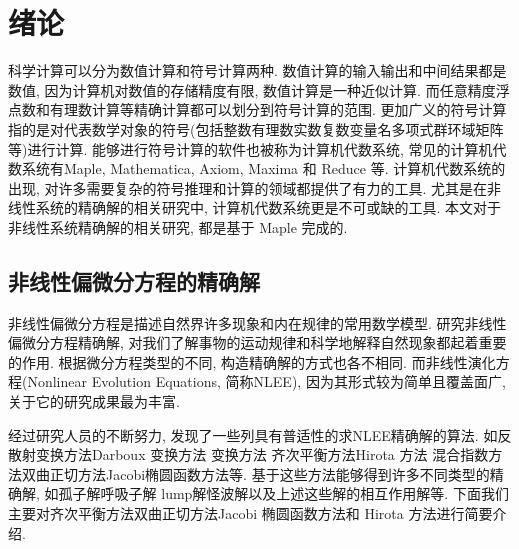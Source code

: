 \chapter{绪论} 
科学计算可以分为数值计算和符号计算两种. 数值计算的输入输出和中间结果都是数值, 因为计算机对数值的存储精度有限, 数值计算是一种近似计算. 而任意精度浮点数和有理数计算等精确计算都可以划分到符号计算的范围. 更加广义的符号计算指的是对代表数学对象的符号(包括整数\D 有理数\D 实数\D 复数\D 变量名\D 多项式\D 群\D 环\D 域\D 矩阵等)进行计算. 能够进行符号计算的软件也被称为计算机代数系统, 常见的计算机代数系统有Maple, Mathematica, Axiom, Maxima 和 Reduce 等. 计算机代数系统的出现, 对许多需要复杂的符号推理和计算的领域都提供了有力的工具. 尤其是在非线性系统的精确解的相关研究中, 计算机代数系统更是不可或缺的工具. 本文对于非线性系统精确解的相关研究, 都是基于 Maple 完成的. 

\section{非线性偏微分方程的精确解}
非线性偏微分方程是描述自然界许多现象和内在规律的常用数学模型. 研究非线性偏微分方程精确解, 对我们了解事物的运动规律和科学地解释自然现象都起着重要的作用. 根据微分方程类型的不同, 构造精确解的方式也各不相同. 而非线性演化方程(Nonlinear Evolution Equations, 简称NLEE), 因为其形式较为简单且覆盖面广, 关于它的研究成果最为丰富. 

经过研究人员的不断努力, 发现了一些列具有普适性的求NLEE精确解的算法. 如反散射变换方法\cite{kawata1978inverse,ma2014verifying}\D Darboux 变换方法 \cite{matveev1991darboux,ling2018general,lou1997non}\D \Backlund{}变换方法 \cite{wahlquist1973backlund,li2008method,cheng2015multiple}\D 齐次平衡方法\cite{zhibin1993travelling,wang1995solitary,wang1996application,hbm1998,hbm1998b,hbm1999,senthilvelan2001extended,zhao2002new,feng2004comment,nguyen2015modified,rady2010homogeneous,eslami2014exact}\D Hirota 方法 \cite{hirota1971exact,hereman1991exact,hu2002application,hirota2003vector,ma2015lump}\D 混合指数方法\cite{hereman1986exact}\D 双曲正切方法\cite{huang1989exact,malfliet1992solitary,li_book_2007,parkes1996automated,liu2001master,li2002rath,fan2000extended,yan2001new,zheng2003generalized}\D Jacobi椭圆函数方法\cite{liu2001jacobi,zhang2003jacobi,zhou2003periodic,yin2002automated,yin2003automated,li2004raeem,chen2003improved,wang2005new,gui2005applications,chao2005symbolic}等. 基于这些方法能够得到许多不同类型的精确解, 如孤子解\cite{hirota1971exact,makhankov1980computer}\D 呼吸子解 \cite{tajiri1989breather,guo2011rogue,sun2018general}\D lump解\cite{satsuma1979two,villarroel1999discrete,imai1997dromion}\D 怪波解\cite{guo2011rogue,zhang2014rogue,sun2018general,zhaqilao2018symbolic}以及上述这些解的相互作用解等. 下面我们主要对齐次平衡方法\D 双曲正切方法\D Jacobi 椭圆函数方法和 Hirota 方法进行简要介绍. 

